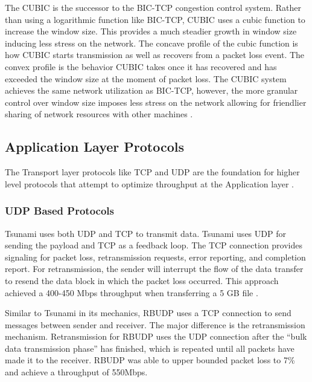 The CUBIC \cite{ha2008cubic} is the successor to the BIC-TCP congestion control system. Rather than using a logarithmic function like BIC-TCP, CUBIC uses a cubic function to increase the window size. This provides a much steadier growth in window size inducing less stress on the network. The concave profile of the cubic function is how CUBIC starts transmission as well as recovers from a packet loss event. The convex profile is the behavior CUBIC takes once it has recovered and has exceeded the window size at the moment of packet loss. The CUBIC system achieves the same network utilization as BIC-TCP, however, the more granular control over window size imposes less stress on the network allowing for friendlier sharing of network resources with other machines \cite{ha2008cubic}.

\subsection{Application Layer Protocols}

The Transport layer protocols like TCP and UDP are the foundation for higher level protocols that attempt to optimize throughput at the Application layer \cite{He2002,Fan2010,Allman1995,Allman1997,Sivakumar2000psockets,Aspera2016,Meiss2007,gu2007udt,lai2009designing}.

\subsubsection{UDP Based Protocols}

Tsunami \cite{Meiss2007} uses both UDP and TCP to transmit data. Tsunami uses UDP for sending the payload and TCP as a feedback loop. The TCP connection provides signaling for packet loss, retransmission requests, error reporting, and completion report. For retransmission, the sender will interrupt the flow of the data transfer to resend the data block in which the packet loss occurred. This approach achieved a 400-450 Mbps throughput when transferring a 5 GB file \cite{Meiss2007}.

Similar to Tsunami in its mechanics, RBUDP \cite{He2002} uses a TCP connection to send messages between sender and receiver. The major difference is the retransmission mechanism. Retransmission for RBUDP uses the UDP connection after the ``bulk data transmission phase'' has finished, which is repeated until all packets have made it to the receiver. RBUDP was able to upper bounded packet loss to 7\% and achieve a throughput of 550Mbps.

